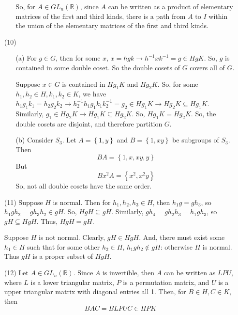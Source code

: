 \begin{itemize}
\begin{itemize}
So, for $A \in GL_n(\mathbb{R})$, since $A$ can be written as a product of elementary matrices of the first and third kinds, there is a path from $A$ to $I$ within the union of the elementary matrices of the first and third kinds.
\end{itemize}
\item[(10)]
\begin{itemize}
\item[(a)]
For $g \in G$, then for some $x$, $x = hgk \rightarrow h^{-1}xk^{-1} = g \in HgK$. So, $g$ is contained in some double coset. So the double cosets of $G$ covers all of $G$.

Suppose $x \in G$ is contained in $Hg_1K$ and $Hg_2K$. So, for some $h_1, h_2 \in H, k_1, k_2 \in K$, we have $h_1g_1k_1 = h_2g_2k_2 \rightarrow h_2^{-1}h_1g_1k_1k_2^{-1} = g_2 \in Hg_1K \rightarrow Hg_2K \subseteq Hg_1K$. Similarly, $g_1 \in Hg_2K \rightarrow Hg_1K \subseteq Hg_2K$. So, $Hg_1K = Hg_2K$. So, the double cosets are disjoint, and therefore partition $G$.
\item[(b)]
Consider $S_3$. Let $A = \left\lbrace 1, y \right\rbrace$ and $B = \left\lbrace 1, xy \right\rbrace$ be subgroups of $S_3$. Then
$$BA = \left\lbrace 1, x, xy, y \right\rbrace$$
But
$$Bx^2A = \left\lbrace x^2, x^2y \right\rbrace$$
So, not all double cosets have the same order.
\end{itemize}
\item[(11)]
Suppose $H$ is normal. Then for $h_1, h_2, h_3 \in H$, then $h_1g = gh_3$, so $h_1gh_2 = gh_3h_2 \in gH$. So, $HgH \subseteq gH$. Similarly, $gh_4 = gh_2h_3 = h_1gh_3$, so $gH \subseteq HgH$. Thus, $HgH = gH$.

Suppose $H$ is not normal. Clearly, $gH \in HgH$. And, there must exist some $h_1 \in H$ such that for some other $h_2 \in H$, $h_1gh_2 \not \in gH$: otherwise $H$ is normal. Thus $gH$ is a proper subset of $HgH$.
\item[(12)]
Let $A \in GL_n(\mathbb{R})$. Since $A$ is invertible, then $A$ can be written as $LPU$, where $L$ is a lower triangular matrix, $P$ is a permutation matrix, and $U$ is a upper triangular matrix with diagonal entries all 1. Then, for $B \in H, C \in K$, then
$$BAC = BLPUC \in HPK$$
\end{itemize}
%